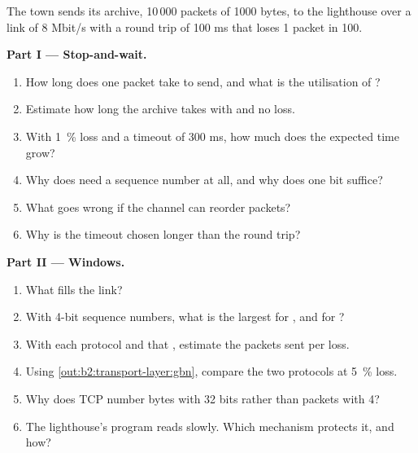 \begin{problem}\label{pb:b2:transport-layer:1}
The town sends its archive, 10\,000 packets of 1000 bytes, to the lighthouse over a link of 8 Mbit/s with a round trip
of 100 ms that loses 1 packet in 100.

\medskip\noindent\textbf{Part I --- Stop-and-wait.}\par\nopagebreak
\begin{enumerate}
\item How long does one packet take to send, and what is the utilisation of ?
\item Estimate how long the archive takes with  and no loss.
\item With 1~\% loss and a timeout of 300 ms, how much does the expected time grow?
\item Why does  need a sequence number at all, and why does one bit suffice?
\item What goes wrong if the channel can reorder packets?
\item Why is the timeout chosen longer than the round trip?
\end{enumerate}

\medskip\noindent\textbf{Part II --- Windows.}\par\nopagebreak
\begin{enumerate}[resume, beginpenalty=10000]
\item What  fills the link?
\item With 4-bit sequence numbers, what is the largest  for , and for ?
\item With each protocol and that , estimate the packets sent per loss.
\item Using \cref{out:b2:transport-layer:gbn}, compare the two protocols at 5~\% loss.
\item Why does TCP number bytes with 32 bits rather than packets with 4?
\item The lighthouse's program reads slowly. Which mechanism protects it, and how?
\end{enumerate}


\end{problem}
